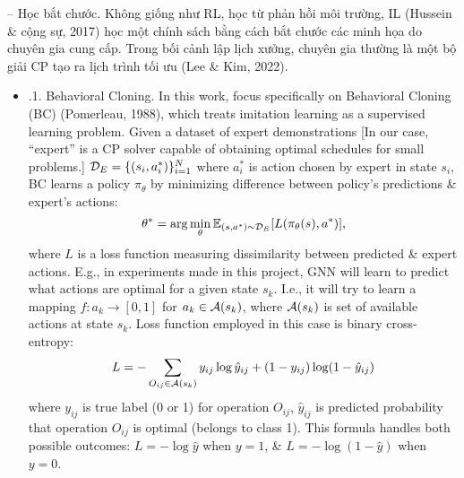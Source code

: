 \documentclass{article}
\begin{document}
\begin{itemize}
\begin{itemize}
        -- {\sf Học bắt chước.} Không giống như RL, học từ phản hồi môi trường, IL (Hussein \& cộng sự, 2017) học một chính sách bằng cách bắt chước các minh họa do chuyên gia cung cấp. Trong bối cảnh lập lịch xưởng, chuyên gia thường là một bộ giải CP tạo ra lịch trình tối ưu (Lee \& Kim, 2022).
        \begin{itemize}
            \item {.1. Behavioral Cloning.} In this work, focus specifically on Behavioral Cloning (BC) (Pomerleau, 1988), which treats imitation learning as a supervised learning problem. Given a dataset of expert demonstrations [In our case, ``expert'' is a CP solver capable of obtaining optimal schedules for small problems.] ${\cal D}_E = \{(s_i,a_i^*)\}_{i=1}^N$ where $a_i^*$ is action chosen by expert in state $s_i$, BC learns a policy $\pi_\theta$ by minimizing difference between policy's predictions \& expert's actions:
            \begin{equation*}
                \theta^* = \arg\min_\theta \mathbb{E}_{(s,a^*)\sim{\cal D}_E}[L(\pi_\theta(s),a^*)],
            \end{equation*}
            where $L$ is a loss function measuring dissimilarity between predicted \& expert actions. E.g., in experiments made in this project, GNN will learn to predict what actions are optimal for a given state $s_k$. I.e., it will try to learn a mapping $f:a_k\to[0,1]$ for $a_k\in{\cal A}(s_k)$, where ${\cal A}(s_k)$ is set of available actions at state $s_k$. Loss function employed in this case is binary cross-entropy:
            \begin{equation*}
                L = -\sum_{O_{ij}\in{\cal A}(s_k)} y_{ij}\log\hat{y}_{ij} + (1 - y_{ij})\log(1 - \hat{y}_{ij})
            \end{equation*}
            where $y_{ij}$ is true label (0 or 1) for operation $O_{ij}$, $\hat{y}_{ij}$ is predicted probability that operation $O_{ij}$ is optimal (belongs to class 1). This formula handles both possible outcomes: $L = -\log\hat{y}$ when $y = 1$, \& $L = -\log(1 - \hat{y})$ when $y = 0$.


\end{itemize}
\end{itemize}
\end{itemize}
\end{document}

